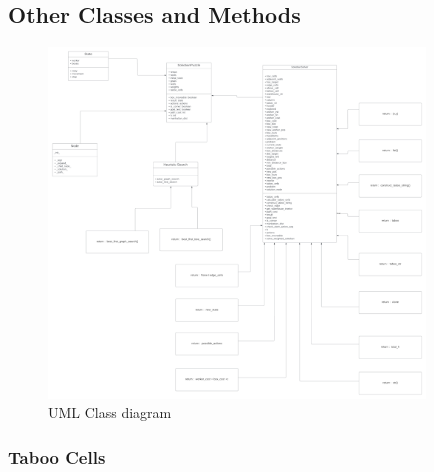 \documentclass[a4paper,12pt]{article}
\begin{document}
\subsection{Other Classes and Methods}

    \begin{figure}[H]
        \centering
        \includegraphics[width=10cm]{uml.png}
        \caption{UML Class diagram}
        \label{fig:svm_conf}
    \end{figure}
\subsubsection{Taboo Cells}
\end{document}
